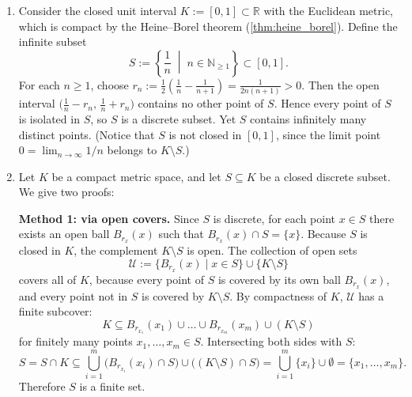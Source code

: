 \begin{exercisesolution}
\label{sol:infinite_discrete_subsets_compact}
\begin{enumerate}[label=\textbf{(\alph*)}]
  \item Consider the closed unit interval $K := [0, 1] \subset \mathbb{R}$ with the Euclidean metric,
    which is compact by the Heine--Borel theorem (\cref{thm:heine_borel}).
    Define the infinite subset
    \[S := \left\{\frac{1}{n} \;\middle|\; n \in \mathbb{N}_{\geq 1}\right\} \subset [0, 1].\]
    For each $n \geq 1$, choose $r_n := \frac{1}{2}\left(\frac{1}{n} - \frac{1}{n+1}\right) = \frac{1}{2n(n+1)} > 0$.
    Then the open interval $\big(\frac{1}{n} - r_n,\, \frac{1}{n} + r_n\big)$ contains no other point of $S$.
    Hence every point of $S$ is isolated in $S$, so $S$ is a discrete subset.
    Yet $S$ contains infinitely many distinct points. (Notice that $S$ is not closed in $[0, 1]$,
    since the limit point $0 = \lim_{n\to\infty} 1/n$ belongs to $K \setminus S$.)

  \item Let $K$ be a compact metric space, and let $S \subseteq K$ be a closed discrete subset.
    We give two proofs:

    \textbf{Method 1: via open covers.}
    Since $S$ is discrete, for each point $x \in S$ there exists an open ball $B_{r_x}(x)$ such that
    $B_{r_x}(x) \cap S = \{x\}$.
    Because $S$ is closed in $K$, the complement $K \setminus S$ is open.
    The collection of open sets
    \[\mathcal{U} := \big\{B_{r_x}(x) \;\big|\; x \in S\big\} \cup \{K \setminus S\}\]
    covers all of $K$, because every point of $S$ is covered by its own ball $B_{r_x}(x)$, and every
    point not in $S$ is covered by $K \setminus S$.
    By compactness of $K$, $\mathcal{U}$ has a finite subcover:
    \[K \subseteq B_{r_{x_1}}(x_1) \cup \dots \cup B_{r_{x_m}}(x_m) \cup (K \setminus S)\]
    for finitely many points $x_1, \dots, x_m \in S$.
    Intersecting both sides with $S$:
    \[S = S \cap K \subseteq \bigcup_{i=1}^m \big(B_{r_{x_i}}(x_i) \cap S\big) \cup \big((K \setminus S) \cap S\big)
      = \bigcup_{i=1}^m \{x_i\} \cup \emptyset = \{x_1, \dots, x_m\}.\]
    Therefore $S$ is a finite set.


\end{enumerate}
\end{exercisesolution}
